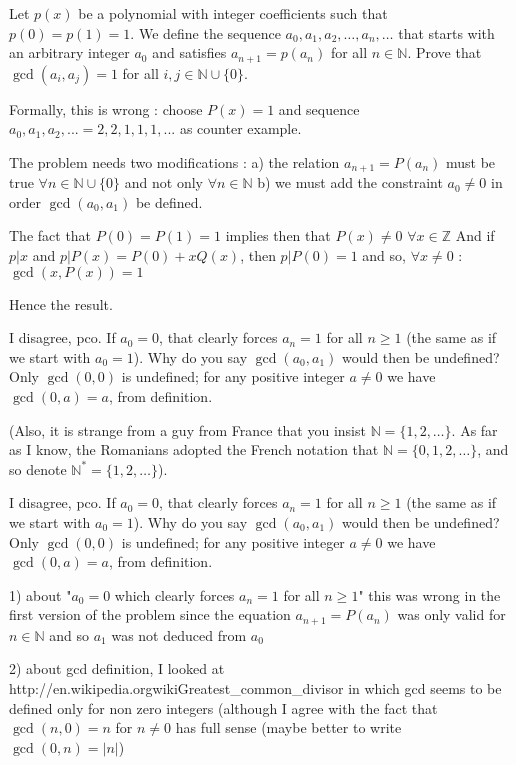 \begin{solution}
	\begin{tcolorbox}Let $p(x)$ be a polynomial with integer coefficients such that $p(0)=p(1)=1$. We define the sequence $a_0, a_1, a_2, \ldots, a_n, \ldots$ that starts with an arbitrary integer $a_0$ and satisfies $a_{n+1}=p(a_n)$ for all $n \in \mathbb N$. Prove that $\gcd(a_i,a_j)=1$ for all $i,j \in \mathbb N \cup \{0\}$.\end{tcolorbox}
Formally, this is wrong : choose $P(x)=1$ and sequence $a_0,a_1,a_2,...=2,2,1,1,1,...$ as counter example.

The problem needs two modifications :
a) the relation $a_{n+1}=P(a_n)$ must be true $\forall n\in\mathbb N\cup\{0\}$ and not only $\forall n\in\mathbb N$
b) we must add the constraint $a_0\ne 0$ in order $\gcd(a_0,a_1)$ be defined.

The fact that $P(0)=P(1)=1$ implies then that $P(x)\ne 0$ $\forall x\in\mathbb Z$
And if $p|x$ and $p|P(x)=P(0)+xQ(x)$, then $p|P(0)=1$ and so, $\forall x\ne 0$ : $\gcd(x,P(x))=1$

Hence the result.
\end{solution}



\begin{solution}
	I disagree, pco. If $a_0 = 0$, that clearly forces $a_n = 1$ for all $n\geq 1$ (the same as if we start with $a_0=1$). Why do you say $\gcd(a_0,a_1)$ would then be undefined? Only $\gcd(0,0)$ is undefined; for any positive integer $a \neq 0$ we have $\gcd(0,a) = a$, from definition.

(Also, it is strange from a guy from France that you insist $\mathbb{N} = \{1,2,\ldots\}$. As far as I know, the Romanians adopted the French notation that $\mathbb{N} = \{0,1,2,\ldots\}$, and so denote $\mathbb{N}^* = \{1,2,\ldots\}$).
\end{solution}



\begin{solution}
	\begin{tcolorbox}I disagree, pco. If $a_0 = 0$, that clearly forces $a_n = 1$ for all $n\geq 1$ (the same as if we start with $a_0=1$). Why do you say $\gcd(a_0,a_1)$ would then be undefined? Only $\gcd(0,0)$ is undefined; for any positive integer $a \neq 0$ we have $\gcd(0,a) = a$, from definition.\end{tcolorbox}
1) about "$a_0 = 0$ which clearly forces $a_n = 1$ for all $n\geq 1$" this was wrong in the first version of the problem since the equation $a_{n+1}=P(a_n)$ was only valid for $n\in\mathbb N$ and so $a_1$ was not deduced from $a_0$

2) about gcd definition, I looked at http://en.wikipedia.org\/wiki\/Greatest_common_divisor in which gcd seems to be defined only for non zero integers (although I agree with the fact that $\gcd(n,0)=n$ for $n\ne 0$ has full sense (maybe better to write $\gcd(0,n)=|n|$)
\end{solution}



